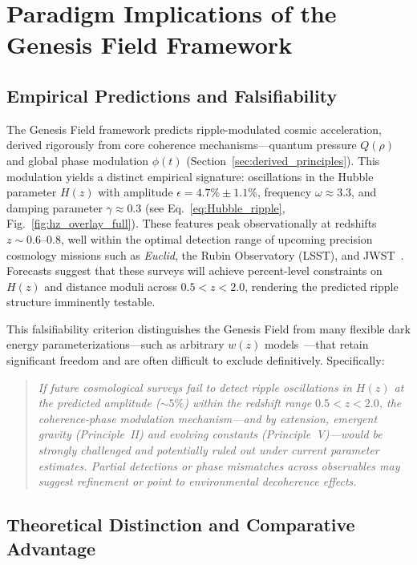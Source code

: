 \section{Paradigm Implications of the Genesis Field Framework}
\label{interpretation}

\subsection{Empirical Predictions and Falsifiability}

The Genesis Field framework predicts ripple-modulated cosmic acceleration, derived rigorously from core coherence mechanisms—quantum pressure \( Q(\rho) \) and global phase modulation \( \phi(t) \) (Section~\ref{sec:derived_principles}). This modulation yields a distinct empirical signature: oscillations in the Hubble parameter \( H(z) \) with amplitude \( \epsilon = 4.7\% \pm 1.1\% \), frequency \( \omega \approx 3.3 \), and damping parameter \( \gamma \approx 0.3 \) (see Eq.~\ref{eq:Hubble_ripple}, Fig.~\ref{fig:hz_overlay_full}). These features peak observationally at redshifts \( z \sim 0.6 \)–\( 0.8 \), well within the optimal detection range of upcoming precision cosmology missions such as \textit{Euclid}, the Rubin Observatory (LSST), and JWST~\cite{Laureijs2011,LSST2009,Gardner2006}. Forecasts suggest that these surveys will achieve percent-level constraints on \( H(z) \) and distance moduli across \( 0.5 < z < 2.0 \), rendering the predicted ripple structure imminently testable.

This falsifiability criterion distinguishes the Genesis Field from many flexible dark energy parameterizations—such as arbitrary \( w(z) \) models~\cite{Chevallier2001,Linder2003}—that retain significant freedom and are often difficult to exclude definitively. Specifically:

\begin{quote}
\textit{If future cosmological surveys fail to detect ripple oscillations in \( H(z) \) at the predicted amplitude (\( \sim5\% \)) within the redshift range \( 0.5 < z < 2.0 \), the coherence-phase modulation mechanism—and by extension, emergent gravity (Principle~II) and evolving constants (Principle~V)—would be strongly challenged and potentially ruled out under current parameter estimates. Partial detections or phase mismatches across observables may suggest refinement or point to environmental decoherence effects.}
\end{quote}

\subsection{Theoretical Distinction and Comparative Advantage}

